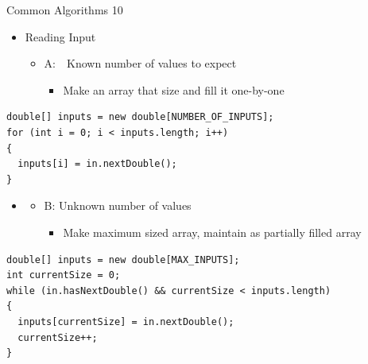\documentclass[aspectratio=43,10pt,t]{beamer}
\begin{document}
\begin{frame}[fragile]{Common Algorithms 10}
  \begin{itemize}
    \item Reading Input
      \begin{itemize}
        \item A:\ \ Known number of values to expect
          \begin{itemize}
            \item Make an array that size and fill it one-by-one
          \end{itemize}
      \end{itemize}
  \end{itemize}
\begin{lstlisting}[linewidth=0.85\linewidth,xleftmargin=0.12\linewidth]
double[] inputs = new double[NUMBER_OF_INPUTS];
for (int i = 0; i < inputs.length; i++)
{
  inputs[i] = in.nextDouble();
}
\end{lstlisting}
  \begin{itemize}
    \item[]
      \begin{itemize}
        \item B: Unknown number of values
          \begin{itemize}
            \item Make maximum sized array, maintain as partially filled array
          \end{itemize}
      \end{itemize}
  \end{itemize}
\begin{lstlisting}[linewidth=0.88\linewidth,xleftmargin=0.1\linewidth]
double[] inputs = new double[MAX_INPUTS];
int currentSize = 0;
while (in.hasNextDouble() && currentSize < inputs.length)
{
  inputs[currentSize] = in.nextDouble();
  currentSize++;
}
\end{lstlisting}
\end{frame}
\end{document}
